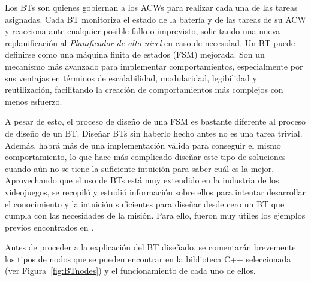 \documentclass[fontsize=11pt, English=false, Español=true, Myfinal=true, twoside, numbers=noenddot]{scrbook}
\begin{document}
Los \glspl{BT} son quienes gobiernan a los \glspl{ACW} para realizar cada una de las tareas asignadas. Cada \gls{BT} monitoriza el estado de la batería y de las tareas de su \gls{ACW} y reacciona ante cualquier posible fallo o imprevisto, solicitando una nueva replanificación al \emph{Planificador de alto nivel} en caso de necesidad. Un \gls{BT} puede definirse como una máquina finita de estados (\gls{FSM}) mejorada. Son un mecanismo más avanzado para implementar comportamientos, especialmente por sus ventajas en términos de escalabilidad, modularidad, legibilidad y reutilización, facilitando la creación de comportamientos más complejos con menos esfuerzo.

A pesar de esto, el proceso de diseño de una \gls{FSM} es bastante diferente al proceso de diseño de un \gls{BT}. Diseñar \glspl{BT} sin haberlo hecho antes no es una tarea trivial. Además, habrá más de una implementación válida para conseguir el mismo comportamiento, lo que hace más complicado diseñar este tipo de soluciones cuando aún no se tiene la suficiente intuición para saber cuál es la mejor. Aprovechando que el uso de \glspl{BT} está muy extendido en la industria de los videojuegos, se recopiló y estudió información sobre ellos para intentar desarrollar el conocimiento y la intuición suficientes para diseñar desde cero un \gls{BT} que cumpla con las necesidades de la misión. Para ello, fueron muy útiles los ejemplos previos encontrados en \cite{BT-CPP-doc, colledanchise2018behavior, BT-AI}.

Antes de proceder a la explicación del \gls{BT} diseñado, se comentarán brevemente los tipos de nodos que se pueden encontrar en la biblioteca C++ seleccionada (ver Figura~\ref{fig:BTnodes}) y el funcionamiento de cada uno de ellos.
\end{document}
